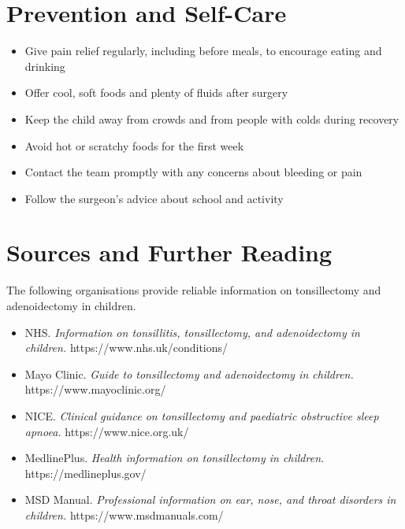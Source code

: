 \section*{Prevention and Self-Care}
\begin{itemize}
    \item Give pain relief regularly, including before meals, to encourage eating and drinking
    \item Offer cool, soft foods and plenty of fluids after surgery
    \item Keep the child away from crowds and from people with colds during recovery
    \item Avoid hot or scratchy foods for the first week
    \item Contact the team promptly with any concerns about bleeding or pain
    \item Follow the surgeon's advice about school and activity
\end{itemize}

\section*{Sources and Further Reading}
The following organisations provide reliable information on tonsillectomy and adenoidectomy in children.

\begin{itemize}
    \item NHS. \textit{Information on tonsillitis, tonsillectomy, and adenoidectomy in children.} https://www.nhs.uk/conditions/
    \item Mayo Clinic. \textit{Guide to tonsillectomy and adenoidectomy in children.} https://www.mayoclinic.org/
    \item NICE. \textit{Clinical guidance on tonsillectomy and paediatric obstructive sleep apnoea.} https://www.nice.org.uk/
    \item MedlinePlus. \textit{Health information on tonsillectomy in children.} https://medlineplus.gov/
    \item MSD Manual. \textit{Professional information on ear, nose, and throat disorders in children.} https://www.msdmanuals.com/
\end{itemize}

